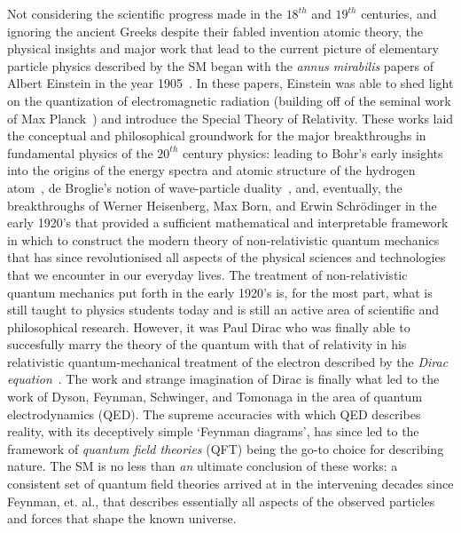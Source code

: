 Not considering the scientific progress made in the $18^{th}$ and $19^{th}$ centuries, and
ignoring the ancient Greeks despite their fabled invention atomic theory,
the physical insights and major work that lead to the current picture of elementary particle
physics described by the SM began with the \textit{annus mirabilis} papers of Albert
Einstein in the year 1905~\cite{einsteinPEE,einsteinSpecial,einsteinEnergyMass}.
In these papers, Einstein was able to shed light on the quantization of electromagnetic
radiation (building off of the seminal work of Max Planck~\cite{planckBlackBody})
and introduce the Special Theory of Relativity.
These works laid the conceptual
and philosophical groundwork for the major breakthroughs in fundamental physics
of the $20^{th}$ century physics: leading to Bohr's early insights into the origins of the
energy spectra and atomic structure of the hydrogen atom~\cite{bohrSpectral}, de Broglie's 
notion of wave-particle duality~\cite{deBroglie}, and, eventually, the breakthroughs of
Werner Heisenberg, Max Born, and Erwin Schr{\"o}dinger in the early 1920's that provided a sufficient
mathematical and interpretable framework in which to construct the modern theory
of non-relativistic quantum mechanics that has since revolutionised all aspects of the
physical sciences and technologies that we encounter in our everyday lives.
The treatment of non-relativistic quantum mechanics put forth in the early 1920's
is, for the most part, what is still taught to physics students today and is still an active
area of scientific and philosophical research. However, it was Paul Dirac who was finally able
to succesfully marry the theory of the quantum with that of relativity in his
relativistic quantum-mechanical treatment of the electron described by
the \textit{Dirac equation}~\cite{diracEquation,diracPrinciples}. The work and 
strange imagination of Dirac is finally what led to the work of Dyson, Feynman, Schwinger,
and Tomonaga in the area of quantum electrodynamics (QED). The supreme accuracies with
which QED describes reality, with its deceptively simple `Feynman diagrams', has since led
to the framework of \textit{quantum field theories} (QFT) being the go-to choice for
describing nature. The SM is no less than \textit{an} ultimate conclusion of these works: a consistent set
of quantum field theories arrived at in the intervening decades since Feynman, et. al.,
that describes essentially all aspects of the observed particles and forces that shape the known universe.



